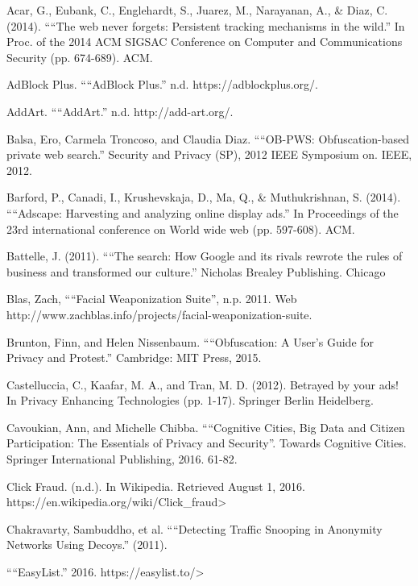 \documentclass[conference]{IEEEtran}
\begin{document}
\begin{thebibliography}{99}

 Acar, G., Eubank, C., Englehardt, S., Juarez, M., Narayanan, A., \& Diaz, C. (2014). ““The web never forgets: Persistent tracking mechanisms in the wild.” In Proc. of the 2014 ACM SIGSAC Conference on Computer and Communications Security (pp. 674-689). ACM.

 AdBlock Plus. ““AdBlock Plus.” n.d. https://adblockplus.org/.

 AddArt. ““AddArt.” n.d. http://add-art.org/.

 Balsa, Ero, Carmela Troncoso, and Claudia Diaz. ““OB-PWS: Obfuscation-based private web search.” Security and Privacy (SP), 2012 IEEE Symposium on. IEEE, 2012.

 Barford, P., Canadi, I., Krushevskaja, D., Ma, Q., \& Muthukrishnan, S. (2014). ““Adscape: Harvesting and analyzing online display ads.” In Proceedings of the 23rd international conference on World wide web (pp. 597-608). ACM.

 Battelle, J. (2011). ““The search: How Google and its rivals rewrote the rules of business and transformed our culture.” Nicholas Brealey Publishing. Chicago

 Blas, Zach, ““Facial Weaponization Suite”, n.p. 2011. Web http://www.zachblas.info/projects/facial-weaponization-suite.

 Brunton, Finn, and Helen Nissenbaum. ““Obfuscation: A User's Guide for Privacy and Protest.” Cambridge: MIT Press, 2015.

 Castelluccia, C., Kaafar, M. A., and Tran, M. D. (2012). Betrayed by your ads! In Privacy Enhancing Technologies (pp. 1-17). Springer Berlin Heidelberg.

 Cavoukian, Ann, and Michelle Chibba. ““Cognitive Cities, Big Data and Citizen Participation: The Essentials of Privacy and Security”. Towards Cognitive Cities. Springer International Publishing, 2016. 61-82.

 Click Fraud. (n.d.). In Wikipedia. Retrieved August 1, 2016. https://en.wikipedia.org/wiki/Click\_fraud>

 Chakravarty, Sambuddho, et al. ““Detecting Traffic Snooping in Anonymity Networks Using Decoys.” (2011).

 ““EasyList.” 2016. https://easylist.to/>


\end{thebibliography}
\end{document}
